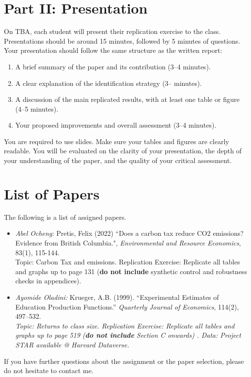 \documentclass[letterpaper,12pt]{article}
\begin{document}
\section*{Part II: Presentation}

On TBA, each student will present their replication exercise to the class. Presentations should be around 15 minutes, followed by 5 minutes of questions. Your presentation should follow the same structure as the written report:

\begin{enumerate}
    \item A brief summary of the paper and its contribution (3--4 minutes).
    \item A clear explanation of the identification strategy (3-- minutes).
    \item A discussion of the main replicated results, with at least one table or figure (4--5 minutes).
    \item Your proposed improvements and overall assessment (3--4 minutes).
\end{enumerate}

\noindent You are required to use slides. Make sure your tables and figures are clearly readable. You will be evaluated on the clarity of your presentation, the depth of your understanding of the paper, and the quality of your critical assessment.

\section*{List of Papers}

The following is a list of assigned papers.

\begin{itemize}

\item \textit{Abel Ocheng:} Pretis, Felix (2022) ``Does a carbon tax reduce CO2 emissions? Evidence from British Columbia.", \textit{Environmental and Resource Economics}, 83(1), 115-144. \\
Topic: Carbon Tax and emissions. Replication Exercise: Replicate all tables and graphs up to page 131 (\textbf{do not include} synthetic control and robustness checks in appendices).

\item \textit{Ayomide Oladini:} Krueger, A.B. (1999). ``Experimental Estimates of Education Production Functions.'' \textit{Quarterly Journal of Economics}, 114(2), 497--532.\\
    \textit{Topic: Returns to class size. Replication Exercise: Replicate all tables and graphs up to page 519 (\textbf{do not include} Section C onwards) . Data:  Project STAR available @ Harvard Dataverse.}

\end{itemize}

\noindent If you have further questions about the assignment or the paper selection, please do not hesitate to contact me.
\end{document}
